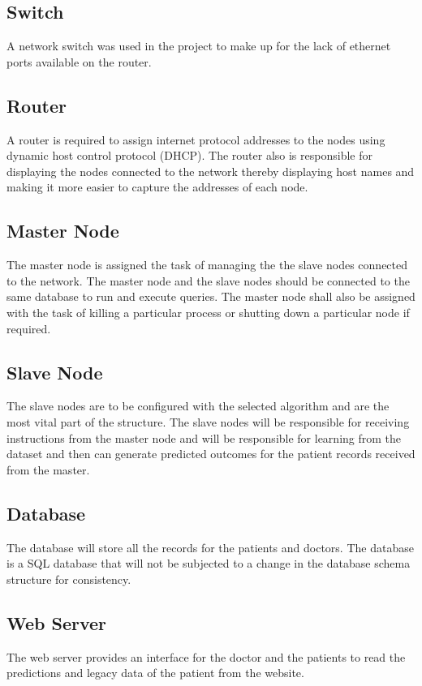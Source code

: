 \documentclass[12pt]{article}
\begin{document}
\subsection{Switch}
A network switch was used in the project to make up for the lack of ethernet ports available on the router.

\subsection{Router}
A router is required to assign internet protocol addresses to the nodes using dynamic host control protocol (DHCP). The router also is responsible for displaying the nodes connected to the network thereby displaying host names and making it more easier to capture the addresses of each node.

\subsection{Master Node}
The master node is assigned the task of managing the the slave nodes connected to the network. The master node and the slave nodes should be connected to the same database to run and execute queries. The master node shall also be assigned with the task of killing a particular process or shutting down a particular node if required.

\subsection{Slave Node}
The slave nodes are to be configured with the selected algorithm and are the most vital part of the structure. The slave nodes will be responsible for receiving instructions from the master node and will be responsible for learning from the dataset and then can generate predicted outcomes for the patient records received from the master. 

\subsection{Database}
The database will store all the records for the patients and doctors. The database is a SQL database that will not be subjected to a change in the database schema structure for consistency.

\subsection{Web Server}
The web server provides an interface for the doctor and the patients to read the predictions and legacy data of the patient from the website.
\end{document}
